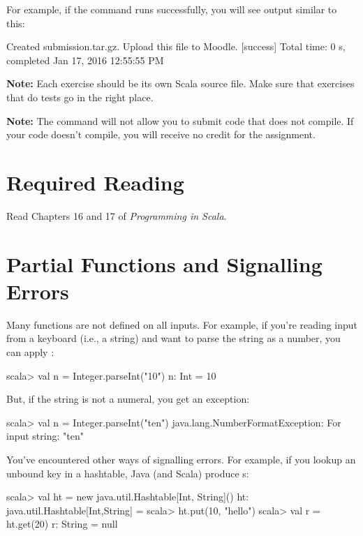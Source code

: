 \documentclass{book}
\begin{document}
For example, if the command runs successfully, you will see output similar
to this:
%
\begin{console}
Created submission.tar.gz. Upload this file to Moodle.
[success] Total time: 0 s, completed Jan 17, 2016 12:55:55 PM
\end{console}

\textbf{Note:}  Each exercise should be its own Scala source file.  Make sure that exercises that do tests go in the right place.

\textbf{Note:}  The command will not allow you to submit code that does not
compile. If your code doesn't compile, you will receive no credit for the
assignment.

\newlecture

\section{Required Reading}

Read Chapters 16 and 17 of \emph{Programming in Scala}.

\section{Partial Functions and Signalling Errors}

Many functions are not defined on all inputs. For example, if you're reading
input from a keyboard (i.e., a string) and want to parse the string as a
number, you can apply :

\begin{console}
scala> val n = Integer.parseInt("10")
n: Int = 10
\end{console}

But, if the string is not a numeral, you get an exception:

\begin{console}
scala> val n = Integer.parseInt("ten")
java.lang.NumberFormatException: For input string: "ten"
\end{console}

You've encountered other ways of signalling errors. For example, if you lookup
an unbound key in a hashtable, Java (and Scala) produce s:

\begin{console}
scala> val ht = new java.util.Hashtable[Int, String]()
ht: java.util.Hashtable[Int,String] = {}
scala> ht.put(10, "hello")
scala> val r = ht.get(20)
r: String = null
\end{console}
\end{document}
